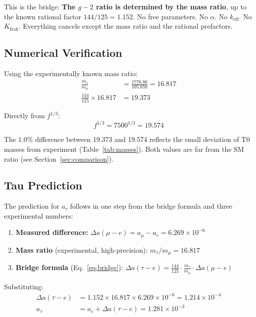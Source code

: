 This is the bridge: \textbf{The $g-2$ ratio is determined by the mass ratio}, up to the known rational factor $144/125 = 1.152$. No free parameters. No $\alpha$. No $k_\text{eff}$. No $K_\text{frak}$. Everything cancels except the mass ratio and the rational prefactors.

\subsection{Numerical Verification}

Using the experimentally known mass ratio:
\begin{align}
	\frac{m_\tau}{m_\mu} &= \frac{1776.86}{105.658} = 16.817 \\
	\frac{144}{125} \times 16.817 &= 19.373
\end{align}

Directly from $f^{1/3}$:
\begin{equation}
	f^{1/3} = 7500^{1/3} = 19.574
\end{equation}

The $1.0\%$ difference between 19.373 and 19.574 reflects the small deviation of T0 masses from experiment (Table~\ref{tab:masses}). Both values are far from the SM ratio (see Section~\ref{sec:comparison}).

\subsection{Tau Prediction}

The prediction for $a_\tau$ follows in one step from the bridge formula and three experimental numbers:

\begin{enumerate}
	\item \textbf{Measured difference:} $\Delta a(\mu{-}e) = a_\mu - a_e = 6.269 \times 10^{-6}$
	\item \textbf{Mass ratio} (experimental, high-precision): $m_\tau/m_\mu = 16.817$
	\item \textbf{Bridge formula} (Eq.~\ref{eq:bridge}): $\Delta a(\tau{-}e) = \frac{144}{125} \cdot \frac{m_\tau}{m_\mu} \cdot \Delta a(\mu{-}e)$
\end{enumerate}

Substituting:
\begin{align}
	\Delta a(\tau{-}e) &= 1.152 \times 16.817 \times 6.269 \times 10^{-6} = 1.214 \times 10^{-4} \\
	a_\tau &= a_e + \Delta a(\tau{-}e) = \boxed{1.281 \times 10^{-3}}
	\label{eq:taupred}
\end{align}

